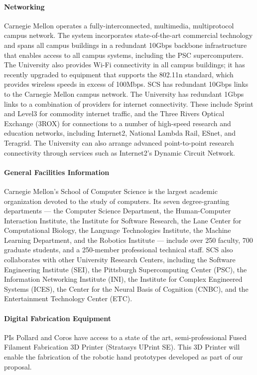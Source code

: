 \documentclass[11pt]{article}
\begin{document}
\paragraph{Networking}
Carnegie Mellon operates a fully-interconnected, multimedia, multiprotocol campus network. The system incorporates
state-of-the-art commercial technology and spans all campus buildings in a redundant 10Gbps backbone infrastructure
that enables access to all campus systems, including the PSC supercomputers. The University also provides Wi-Fi
connectivity in all campus buildings; it has recently upgraded to equipment that supports the 802.11n standard, which
provides wireless speeds in excess of 100Mbps.
SCS has redundant 10Gbps links to the Carnegie Mellon campus network. The University has redundant 1Gbps links to a
combination of providers for internet connectivity. These include Sprint and Level3 for commodity internet traffic, and
the Three Rivers Optical Exchange (3ROX) for connections to a number of high-speed research and education networks,
including Internet2, National Lambda Rail, ESnet, and Teragrid. The University can also arrange advanced point-to-point
research connectivity through services such as Internet2's Dynamic Circuit Network.

\paragraph{General Facilities Information}
Carnegie Mellon's School of Computer Science is the largest academic organization devoted to the study of computers.
Its seven degree-granting departments --- the Computer Science Department, the Human-Computer Interaction Institute,
the Institute for Software Research, the Lane Center for Computational Biology, the Language Technologies Institute,
the Machine Learning Department, and the Robotics Institute --- include over 250 faculty, 700 graduate students, and a
250-member professional technical staff. SCS also collaborates with other University Research Centers, including the
Software Engineering Institute (SEI), the Pittsburgh Supercomputing Center (PSC), the Information Networking Institute
(INI), the Institute for Complex Engineered Systems (ICES), the Center for the Neural Basis of Cognition (CNBC), and the
Entertainment Technology Center (ETC).

\paragraph{Digital Fabrication Equipment}
PIs Pollard and Coros have access to a state of the art, semi-professional Fused Filament Fabrication 3D Printer (Stratasys UPrint SE). 
This 3D Printer will enable the fabrication of the robotic hand prototypes developed as part of our proposal.


\vfill
\end{document}
